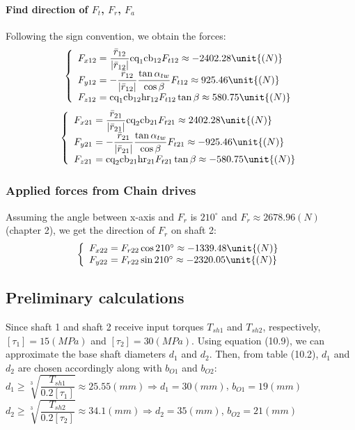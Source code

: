 \paragraph{Find direction of $ F_{t} $, $ F_r $, $ F_a $}
Following the sign convention, we obtain the forces:
\[
\left\{ 
\begin{array}{l@{{}={}}l}
F_{x12}& \dfrac{\bar{r}_{12}}{|\bar{r}_{12}|}\text{cq}_1\text{cb}_{12}F_{t12}\approx -2402.28 \unit{(N)}\\
F_{y12}& -\dfrac{\bar{r}_{12}}{|\bar{r}_{12}|}\dfrac{\tan\alpha_{tw}}{\cos\beta}F_{t12}\approx 925.46 \unit{(N)}\\

F_{z12}& \text{cq}_1\text{cb}_{12}\text{hr}_{12}F_{t12}\tan\beta\approx 580.75 \unit{(N)}\\ 
\end{array}
\right.
\]
\[
\left\{ 
\begin{array}{l@{{}={}}l}
F_{x21}& \dfrac{\bar{r}_{21}}{|\bar{r}_{21}|}\text{cq}_2\text{cb}_{21}F_{t21}\approx 2402.28 \unit{(N)}\\

F_{y21}& -\dfrac{\bar{r}_{21}}{|\bar{r}_{21}|}\dfrac{\tan\alpha_{tw}}{\cos\beta}F_{t21}\approx -925.46 \unit{(N)}\\

F_{z21}& \text{cq}_2\text{cb}_{21}\text{hr}_{21}F_{t21}\tan\beta\approx -580.75 \unit{(N)}\\ 
\end{array}
\right.
\]

\subsubsection{Applied forces from Chain drives}
Assuming the angle between x-axis and $ F_r $ is $ 210^\circ $ and $ F_r \approx 2678.96 \unit{(N)} $ (chapter 2), we get the direction of $ F_r $ on shaft 2:
\[
\left\{ 
\begin{array}{l@{{}={}}l}
F_{x22}& F_{r22}\cos210^\circ\approx -1339.48 \unit{(N)}\\
F_{y22}& F_{r22}\sin210^\circ\approx -2320.05 \unit{(N)}\\
\end{array}
\right.
\]

\subsection{Preliminary calculations}
Since shaft 1 and shaft 2 receive input torques $ T_{sh1} $ and $ T_{sh2} $, respectively, $ [\tau_1] = 15\unit{(MPa)}$ and $ [\tau_2]=30\unit{(MPa)} $. Using equation (10.9), we can approximate the base shaft diameters $ d_1 $ and $ d_2 $. Then, from table (10.2), $ d_1 $ and $ d_2 $ are chosen accordingly along with $ b_{O1} $ and $ b_{O2} $:\\
$ d_1 \geq \sqrt[3]{\dfrac{T_{sh1}}{0.2[\tau_1]}} \approx 25.55 \unit{(mm)}\Rightarrow d_1 = 30 \unit{(mm)}$, $ b_{O1} = 19 \unit{(mm)} $\\
$ d_2 \geq \sqrt[3]{\dfrac{T_{sh2}}{0.2[\tau_2]}} \approx 34.1 \unit{(mm)}\Rightarrow d_2 = 35\unit{(mm)}$, $ b_{O2} = 21 \unit{(mm)} $

